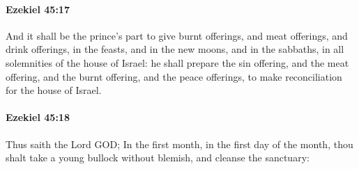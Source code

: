 		\paragraph{Ezekiel 45:17} %
			\label{EZEKIEL-45-17}

			And it shall be the prince’s part to give burnt offerings, and meat offerings, and drink offerings, in the feasts, and in the new moons, and in the sabbaths, in all solemnities of the house of Israel: he shall prepare the sin offering, and the meat offering, and the burnt offering, and the peace offerings, to make reconciliation for the house of Israel.


		\paragraph{Ezekiel 45:18} %
			\label{EZEKIEL-45-18}

			Thus saith the Lord GOD; In the first month, in the first day of the month, thou shalt take a young bullock without blemish, and cleanse the sanctuary:

